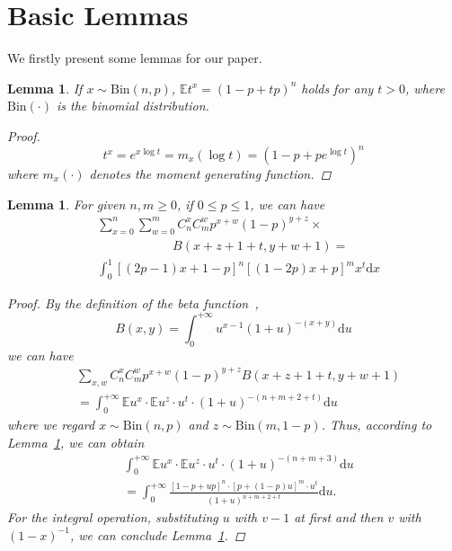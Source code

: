 \documentclass{article}
\newtheorem{lemma}[theorem]{Lemma}
\begin{document}
\section{Basic Lemmas}
We firstly present some lemmas for our paper.
\begin{lemma}
\label{MoGene}
If $x\sim \mathrm{Bin}(n,p)$, $\mathbb{E}t^x= \left(1-p+tp\right)^{n}$ holds for any $t>0$, where $\mathrm{Bin}(\cdot)$ is the binomial distribution.
\begin{proof}
\begin{equation}
t^x = e^{x\log t}=m_x(\log t)= \left(1-p+pe^{\log t}\right)^{n}
\end{equation}
where $m_x(\cdot)$ denotes the moment generating function.
\end{proof}
\end{lemma}

\begin{lemma}
\label{SolveF}
For given $n,m\geq 0$, if $0\leq p\leq 1$, we can have
\begin{equation*}
\begin{split}
&{\sum}_{x=0}^{n}{\sum}_{w=0}^{m} C_{n}^{x}C_{m}^{w}p^{x+w}(1-p)^{y+z}\times\\
&\qquad\qquad\qquad B(x+z+1+t,y+w+1)=\\
&\int_{0}^{1}[(2p-1)x+1-p]^{n}[(1-2p)x+p]^{m}x^{t}\mathrm{d}x
\end{split}
\end{equation*}
\begin{proof}
By the definition of the beta function~\cite{olver2010nist},
\begin{equation}
B(x, y) = \int_{0}^{+\infty} u^{x-1}(1+u)^{-(x+y)}\mathrm{d}u
\end{equation}
we can have
\begin{align}
&\sum_{x,w} C_{n}^{x}C_{m}^{w}p^{x+w}(1-p)^{y+z}B(x+z+1+t,y+w+1)\nonumber\\
&= \int_{0}^{+\infty} \mathbb{E}u^{x}\cdot\mathbb{E}u^z \cdot u^t\cdot (1+u)^{-(n+m+2+t)}\mathrm{d}u
\end{align}
where we regard $x\sim \mathrm{Bin}(n,p)$ and $z\sim \mathrm{Bin}(m,1-p)$.
Thus, according to Lemma~\ref{MoGene}, we can obtain
\begin{equation}
\begin{split}
&\int_{0}^{+\infty} \mathbb{E}u^{x}\cdot\mathbb{E}u^z \cdot u^t\cdot (1+u)^{-(n+m+3)}\mathrm{d}u\\
&=\int_{0}^{+\infty} \frac{[1-p+up]^n\cdot [p+(1-p)u]^m\cdot u^t}{(1+u)^{n+m+2+t}}\mathrm{d}u.
\end{split}
\end{equation}
For the integral operation, substituting $u$ with $v-1$ at first and then $v$ with $(1-x)^{-1}$, we can conclude Lemma~\ref{SolveF}.
\end{proof}
\end{lemma}
\end{document}
